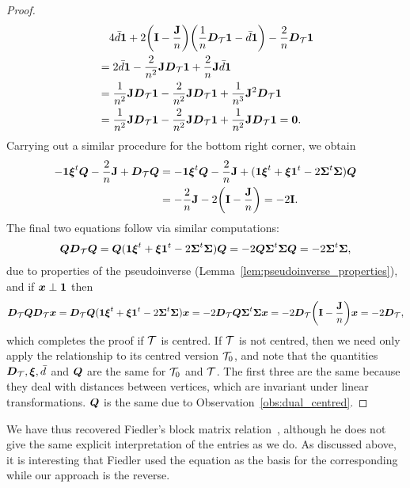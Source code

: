 \begin{proof}
\begin{align*}
	&\quad  4\bar{d}\vb{1} +2\bigg(\vb{I}-\frac{\vb{J}}{n}\bigg)\bigg(\frac{1}{n}\vb*{D}_{\mathcal{T}}\vb{1}-\bar{d}\vb{1}\bigg)  -\frac{2}{n}\vb*{D}_{\mathcal{T}}\vb{1} \\
	&= 2\bar{d}\vb{1} -  \frac{2}{n^2}\vb{J}\vb*{D}_{\mathcal{T}}\vb{1} + \frac{2}{n}\vb{J}\bar{d}\vb{1} \\
	&=\frac{1}{n^2}\vb{J}\vb*{D}_{\mathcal{T}}\vb{1} -  \frac{2}{n^2}\vb{J}\vb*{D}_{\mathcal{T}}\vb{1} + \frac{1}{n^3}\vb{J}^2\vb*{D}_{\mathcal{T}}\vb{1} \\
	&= \frac{1}{n^2}\vb{J}\vb*{D}_{\mathcal{T}}\vb{1} -  \frac{2}{n^2}\vb{J}\vb*{D}_{\mathcal{T}}\vb{1} + \frac{1}{n^2}\vb{J}\vb*{D}_{\mathcal{T}}\vb{1}=\vb{0}.
	\end{align*}
	Carrying out a similar  procedure for  the  bottom right corner, we  obtain  
	\begin{align*}
	-\vb{1}\vb*{\xi}^t\vb*{Q}-\frac{2}{n}\vb{J}+\vb*{D}_{\mathcal{T}}\vb*{Q} &= -\vb{1}\vb*{\xi}^t\vb*{Q}-\frac{2}{n}\vb{J}  + (\vb{1}\vb*{\xi}^t+\vb*{\xi}\vb{1}^t -2\boldsymbol{\Sigma}^t\boldsymbol{\Sigma})\vb*{Q} \\
	&= -\frac{2}{n}\vb{J}-2\bigg(\vb{I}-\frac{\vb{J}}{n}\bigg) = -2\vb{I}.
	\end{align*}
	The  final two equations follow via similar computations: 
	\begin{align*}
	\vb*{Q}\vb*{D}_{\mathcal{T}}\vb*{Q} = \vb*{Q}(\vb{1}\vb*{\xi}^t+\vb*{\xi}\vb{1}^t-2\boldsymbol{\Sigma}^t\boldsymbol{\Sigma})\vb*{Q} = -2\vb*{Q}\boldsymbol{\Sigma}^t\boldsymbol{\Sigma}\vb*{Q} = -2\boldsymbol{\Sigma}^t\boldsymbol{\Sigma},
	\end{align*}
	due to properties of the pseudoinverse (Lemma~\ref{lem:pseudoinverse_properties}), and if $\vb*{x}\perp\vb{1}$ then 
	\begin{align*}
	\vb*{D}_{\mathcal{T}} \vb*{Q}\vb*{D}_{\mathcal{T}} \vb*{x} = \vb*{D}_{\mathcal{T}} \vb*{Q}(\vb{1}\vb*{\xi}^t  +\vb*{\xi}\vb{1}^t - 2\boldsymbol{\Sigma}^t\boldsymbol{\Sigma})\vb*{x} = -2\vb*{D}_{\mathcal{T}}\vb*{Q} \boldsymbol{\Sigma}^t\boldsymbol{\Sigma}\vb*{x} = -2\vb*{D}_{\mathcal{T}}\bigg(\vb{I}-\frac{\vb{J}}{n}\bigg) \vb*{x} = -2\vb*{D}_{\mathcal{T}},
	\end{align*}
	which completes the proof if $\mathcal{T}$ is centred. If $\mathcal{T}$  is not centred, then we need only apply the relationship to its centred  version $\mathcal{T}_0$, and note  that the quantities $\vb*{D}_{\mathcal{T}}, \vb*{\xi},\bar{d}$ and $\vb*{Q}$ are the same for $\mathcal{T}_0$ and $\mathcal{T}$. The first three are the same because they deal with distances between vertices, which are invariant under linear transformations. $\vb*{Q}$ is the  same due to  Observation~\ref{obs:dual_centred}. 
\end{proof}

\begin{remark}
	We have thus recovered Fiedler's block matrix relation~\cite{fiedler1993geometric}, although he does not give the same explicit   interpretation of  the entries as we do. As discussed above, it is interesting that Fiedler used the equation  as the basis for the corresponding while our approach is the reverse. 
\end{remark}

